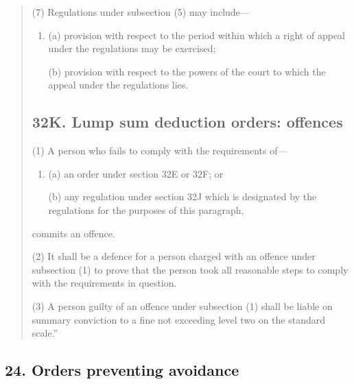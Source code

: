 \documentclass[a4paper]{article}
\begin{document}
\begin{quotation}
(7)
Regulations under subsection (5) may include---
\begin{enumerate}\item[]
(a) provision with respect to the period within which a right of appeal under the regulations may be exercised;

(b) provision with respect to the powers of the court to which the appeal under the regulations lies.
\end{enumerate}

\subsection*{32K. Lump sum deduction orders: offences}

(1) A person who fails to comply with the requirements of---
\begin{enumerate}\item[]
(a) an order under section 32E or 32F; or

(b) any regulation under section 32J which is designated by the regulations for the purposes of this paragraph,
\end{enumerate}
commits an offence.

(2)
It shall be a defence for a person charged with an offence under subsection (1) to prove that the person took all reasonable steps to comply with the requirements in question.

(3)
A person guilty of an offence under subsection (1) shall be liable on summary 
conviction to a fine not exceeding level two on the standard scale.''
\end{quotation}

\subsection{24. Orders preventing avoidance}
\end{document}
